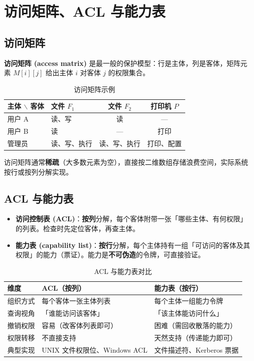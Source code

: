 \section{访问矩阵、ACL 与能力表}

\subsection{访问矩阵}

\textbf{访问矩阵 (access matrix)} 是最一般的保护模型：行是主体，列是客体，矩阵元素 $M[i][j]$ 给出主体 $i$ 对客体 $j$ 的权限集合。

\begin{table}[H]
\centering
\caption{访问矩阵示例}
\begin{tabulary}{\textwidth}{LLCC}
\toprule
主体 $\backslash$ 客体 & 文件 $F_1$ & 文件 $F_2$ & 打印机 $P$ \\
\midrule
用户 A & 读、写 & 读 & --- \\
用户 B & 读 & --- & 打印 \\
管理员 & 读、写、执行 & 读、写、执行 & 打印、配置 \\
\bottomrule
\end{tabulary}
\end{table}

访问矩阵通常\textbf{稀疏}（大多数元素为空），直接按二维数组存储浪费空间，实际系统按行或按列分解实现。

\subsection{ACL 与能力表}

\begin{itemize}
    \item \textbf{访问控制表 (ACL)}：\textbf{按列}分解，每个客体附带一张「哪些主体、有何权限」的列表。检查时先定位客体，再查主体。
    \item \textbf{能力表 (capability list)}：\textbf{按行}分解，每个主体持有一组「可访问的客体及其权限」的能力（票证）。能力是\textbf{不可伪造}的令牌，可直接验证。
\end{itemize}

\begin{table}[H]
\centering
\caption{ACL 与能力表对比}
\begin{tabulary}{\textwidth}{LLL}
\toprule
维度 & ACL（按列） & 能力表（按行） \\
\midrule
组织方式 & 每个客体一张主体列表 & 每个主体一组能力令牌 \\
查询视角 & 「谁能访问该客体」 & 「该主体能访问什么」 \\
撤销权限 & 容易（改客体列表即可） & 困难（需回收散落的能力） \\
权限转移 & 不直接支持 & 天然支持（传递能力即可） \\
典型实现 & UNIX 文件权限位、Windows ACL & 文件描述符、Kerberos 票据 \\
\bottomrule
\end{tabulary}
\end{table}

